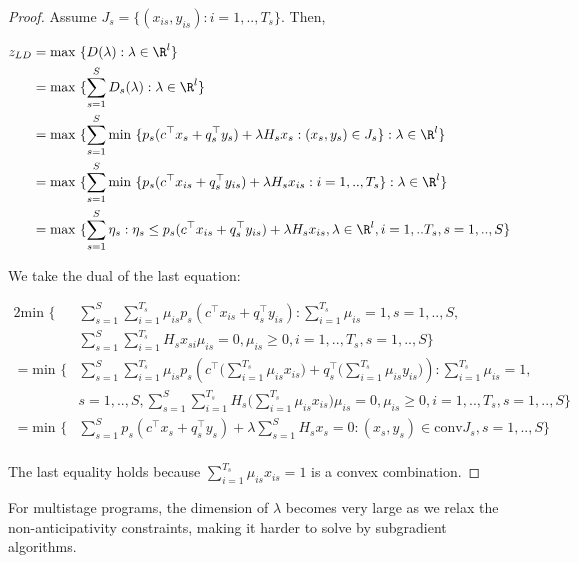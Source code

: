 \begin{proof}
Assume $J_s = \{ (x_{is}, y_{is}) : i=1,..,T_s \}$. Then,

\begin{alignat*}{2}
z_{LD} & = \textrm{max } \{ D(\lambda) : \lambda \in \R^l \} \\
       & = \textrm{max } \{ \sum_{s=1}^S D_s(\lambda) : \lambda \in \R^l \} \\
       & = \textrm{max } \{ \sum_{s=1}^S \textrm{min }\{p_s(c^\top x_s + q_s^\top y_s) + \lambda H_s x_s : (x_s, y_s) \in J_s\} : \lambda \in \R^l \} \\
       & = \textrm{max } \{ \sum_{s=1}^S \textrm{min }\{p_s(c^\top x_{is} + q_s^\top y_{is}) + \lambda H_s x_{is} : i=1,..,T_s\} : \lambda \in \R^l \} \\
       & = \textrm{max } \{ \sum_{s=1}^S \eta_s : \eta_s \leq p_s(c^\top x_{is} + q_s^\top y_{is}) + \lambda H_s x_{is}, \lambda \in \R^l, i=1,..T_s, s=1,..,S \} 
\end{alignat*}

We take the dual of the last equation:

\begin{alignat*}{2}
\textrm{min } \big\{&\sum_{s=1}^S \sum_{i=1}^{T_s} \mu_{is} p_s(c^\top x_{is}+q_s^\top y_{is}) : \sum_{i=1}^{T_s} \mu_{is}=1,
  s=1,..,S,\\
& \sum_{s=1}^S \sum_{i=1}^{T_s} H_s x_{si} \mu_{is} = 0, \mu_{is}\geq 0, i=1,..,T_s, s=1,..,S \big\} \\
=\textrm{min } \big\{&\sum_{s=1}^S \sum_{i=1}^{T_s} \mu_{is} p_s(c^\top \Big(\sum_{i=1}^{T_s} \mu_{is}x_{is}\Big) + q_s^\top \Big(\sum_{i=1}^{T_s} \mu_{is}y_{is}\Big)) : \sum_{i=1}^{T_s} \mu_{is}=1, \\
& s=1,..,S, \sum_{s=1}^S \sum_{i=1}^{T_s} H_s \Big(\sum_{i=1}^{T_s} \mu_{is} x_{is}\Big) \mu_{is} = 0, \mu_{is}\geq 0, i=1,..,T_s, s=1,..,S \big\} \\
= \textrm{min }\{&\sum_{s=1}^S p_s (c^\top x_s + q_s^\top y_s) + \lambda\sum_{s=1}^S H_sx_s=0 : (x_s, y_s) \in \textrm{conv}J_s, s=1,..,S\} \\
\end{alignat*}

The last equality holds because $\sum_{i=1}^{T_s} \mu_{is} x_{is} = 1$ is a convex combination.
\end{proof}

For multistage programs, the dimension of $\lambda$ becomes very large as we relax the non-anticipativity constraints, making it harder to solve by subgradient algorithms.

